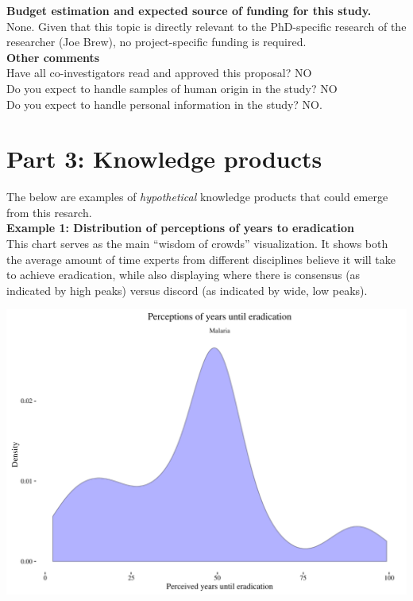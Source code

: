 \documentclass{article}
\begin{document}
\noindent \textbf{Budget estimation and expected source of funding for this study.} \\

\noindent None. Given that this topic is directly relevant to the PhD-specific research of the researcher (Joe Brew), no project-specific funding is required. \\

\noindent \textbf{Other comments} \\

\noindent Have all co-investigators read and approved this proposal? NO \\
\noindent Do you expect to handle samples of human origin in the study? NO \\
\noindent Do you expect to handle personal information in the study? NO. 

\newpage 
\section*{Part 3: Knowledge products}

The below are examples of \emph{hypothetical} knowledge products that could emerge from this resarch. \\

\noindent \textbf{Example 1: Distribution of perceptions of years to eradication} \\
\noindent This chart serves as the main “wisdom of crowds” visualization. It shows both the average amount of time experts from different disciplines believe it will take to achieve eradication, while also displaying where there is consensus (as indicated by high peaks) versus discord (as indicated by wide, low peaks). 


\begin{center}
\includegraphics{chart1.pdf}
\end{center}
\end{document}
